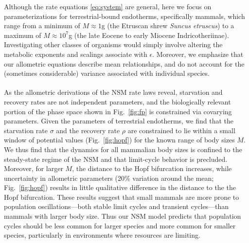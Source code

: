 \documentclass{pnastwo}
\begin{document}
\begin{article}

Although the rate equations \eqref{eq:system} are general, here we focus on
parameterizations for terrestrial-bound endotherms, specifically mammals,
which range from a minimum of $M\approx1$g (the Etruscan shrew
\emph{Suncus etruscus}) to a maximum of $M\approx10^7$g (the late Eocene
to early Miocene Indricotheriinae).  Investigating other classes of organisms
would simply involve altering the metabolic exponents and scalings associate
with $\epsilon$. Moreover, we emphasize that our allometric equations
describe mean relationships, and do not account for the (sometimes
considerable) variance associated with individual species.
\\

 \\
As the allometric derivations of the NSM rate laws reveal, starvation and recovery rates are not independent parameters, and the biologically relevant portion of the phase space shown in Fig.~\ref{fig:fp} is constrained via covarying parameters.  
Given the parameters of terrestrial endotherms, we find that the starvation rate $\sigma$ and the recovery rate $\rho$ are constrained to lie within a small window of potential values (Fig.~\ref{fig:hopf}) for the known range of body sizes $M$. 
We thus find that the dynamics for all mammalian body sizes is confined to the steady-state regime of the NSM and that limit-cycle behavior is precluded.
Moreover, for larger $M$, the distance to the Hopf bifurcation increases, while uncertainty in allometric parameters (20\% variation around the mean; Fig.~\ref{fig:hopf}) results in little qualitative difference in the distance to the the Hopf bifurcation. 
These results suggest that small mammals are more prone to population oscillations---both stable limit cycles and transient cycles---than mammals with larger body size.  
Thus our NSM model predicts that population cycles should be less common for larger species and more common for smaller species, particularly in environments where resources are limiting.%


\end{article}
\end{document}
